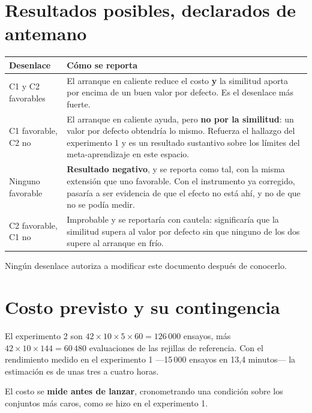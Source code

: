 \documentclass[11pt,letterpaper]{article}
\begin{document}
\section{Resultados posibles, declarados de antemano}
\label{sec:desenlaces}

\begin{center}
\begin{tabularx}{\textwidth}{L{4.6cm} Y}
\toprule
{} \textbf{Desenlace} & \textbf{Cómo se reporta} \\
\midrule
C1 y C2 favorables &
El arranque en caliente reduce el costo \textbf{y} la similitud aporta por encima de
un buen valor por defecto. Es el desenlace más fuerte. \\
\midrule
C1 favorable, C2 no &
El arranque en caliente ayuda, pero \textbf{no por la similitud}: un valor por
defecto obtendría lo mismo. Refuerza el hallazgo del experimento 1 y es un
resultado sustantivo sobre los límites del meta-aprendizaje en este espacio. \\
\midrule
Ninguno favorable &
\textbf{Resultado negativo}, y se reporta como tal, con la misma extensión que uno
favorable. Con el instrumento ya corregido, pasaría a ser evidencia de que el efecto
no está ahí, y no de que no se podía medir. \\
\midrule
C2 favorable, C1 no &
Improbable y se reportaría con cautela: significaría que la similitud supera al valor
por defecto sin que ninguno de los dos supere al arranque en frío. \\
\bottomrule
\end{tabularx}
\end{center}

Ningún desenlace autoriza a modificar este documento después de conocerlo.

\section{Costo previsto y su contingencia}
\label{sec:costo}

El experimento 2 son $42 \times 10 \times 5 \times 60 = 126\,000$ ensayos, más
$42 \times 10 \times 144 = 60\,480$ evaluaciones de las rejillas de referencia. Con
el rendimiento medido en el experimento 1 ---15\,000 ensayos en 13,4 minutos--- la
estimación es de unas tres a cuatro horas.

El costo se \textbf{mide antes de lanzar}, cronometrando una condición sobre los
conjuntos más caros, como se hizo en el experimento 1.
\end{document}
